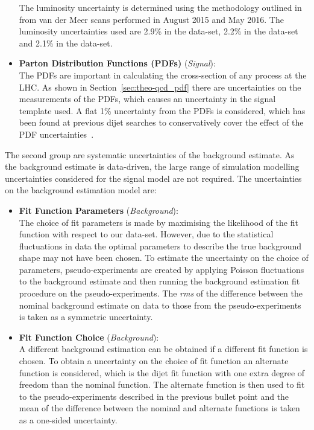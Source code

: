 \begin{itemize}[leftmargin=*]
  The luminosity uncertainty is determined using the methodology outlined in~\cite{lim-syst_lumi}
  from van der Meer scans performed in August 2015 and May 2016.
  The luminosity uncertainties used are 2.9\% in the \summer{} data-set,
  2.2\% in the \lm{} data-set
  and 2.1\% in the \hm{} data-set.
  \vspace{0.5em}
\item\textbf{Parton Distribution Functions (PDFs) } \hspace{1mm}  (\textit{Signal}):\\
  The PDFs are important in calculating the cross-section of any process at the LHC.
  As shown in Section~\ref{sec:theo-qcd_pdf} there are uncertainties on the measurements of the PDFs,
  which causes an uncertainty in the signal template used.
  A flat 1\% uncertainty from the PDFs is considered,
  which has been found at previous dijet searches to conservatively cover
  the effect of the PDF uncertainties~\cite{dijet-mori16_paper}.
  \vspace{0.5em}
\end{itemize}

The second group are systematic uncertainties of the background estimate.
As the background estimate is data-driven,
the large range of simulation modelling uncertainties considered for the signal model are not required.
The uncertainties on the background estimation model are:

\begin{itemize}[leftmargin=*]
\item \textbf{Fit Function Parameters} \hspace{1mm} (\textit{Background}):\\
  The choice of fit parameters is made by maximising the likelihood of the fit function with respect to our data-set.
  However, due to the statistical fluctuations in data the optimal parameters to describe
  the true background shape may not have been chosen.
  To estimate the uncertainty on the choice of parameters, pseudo-experiments are created by applying Poisson
  fluctuations to the background estimate and then running the background estimation fit procedure on the pseudo-experiments.
  The \textit{rms} of the difference between the nominal background estimate on data to those from the pseudo-experiments is
  taken as a symmetric uncertainty. \vspace{0.5em}
\item\textbf{Fit Function Choice}  \hspace{1mm} (\textit{Background}):\\
  A different background estimation can be obtained if a different fit function is chosen.
  To obtain a uncertainty on the choice of fit function an alternate function is considered,
  which is the dijet fit function with one extra degree of freedom than the nominal function.
  The alternate function is then used to fit to the pseudo-experiments described in the previous bullet point
  and the mean of the difference between the nominal and alternate functions is taken as a one-sided uncertainty.
  \vspace{0.5em}
\end{itemize}

